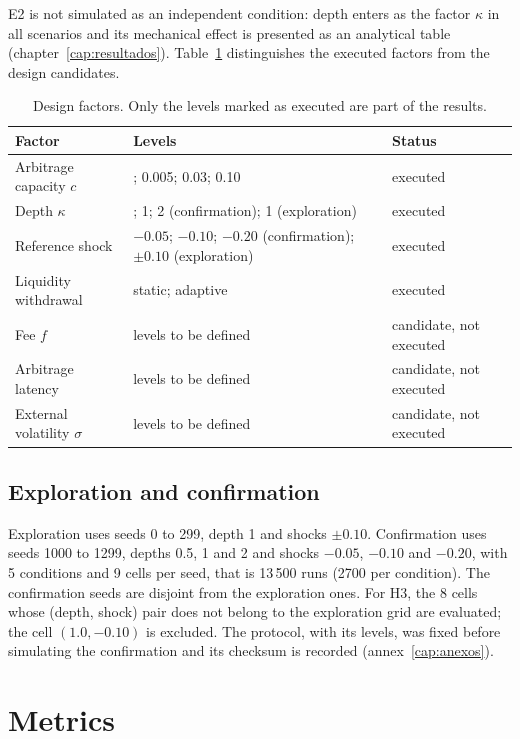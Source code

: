 E2 is not simulated as an independent condition: depth enters as the factor $\kappa$ in all scenarios and its mechanical effect is presented as an analytical table (chapter~\ref{cap:resultados}). Table~\ref{tab:factores} distinguishes the executed factors from the design candidates.

\begin{table}[htbp]
\centering
\caption{Design factors. Only the levels marked as executed are part of the results.}
\label{tab:factores}
\small
\begin{tabularx}{\textwidth}{@{}l >{\raggedright\arraybackslash}X l@{}}
\toprule
Factor & Levels & Status \\
\midrule
Arbitrage capacity $c$ & 0; 0.005; 0.03; 0.10 & executed \\
Depth $\kappa$ & 0.5; 1; 2 (confirmation); 1 (exploration) & executed \\
Reference shock & $-0.05$; $-0.10$; $-0.20$ (confirmation); $\pm0.10$ (exploration) & executed \\
Liquidity withdrawal & static; adaptive & executed \\
Fee $f$ & levels to be defined & candidate, not executed \\
Arbitrage latency & levels to be defined & candidate, not executed \\
External volatility $\sigma$ & levels to be defined & candidate, not executed \\
\bottomrule
\end{tabularx}
\end{table}

\subsection{Exploration and confirmation}

Exploration uses seeds 0 to 299, depth 1 and shocks $\pm0.10$. Confirmation uses seeds 1000 to 1299, depths 0.5, 1 and 2 and shocks $-0.05$, $-0.10$ and $-0.20$, with 5 conditions and 9 cells per seed, that is 13\,500 runs (2700 per condition). The confirmation seeds are disjoint from the exploration ones. For H3, the 8 cells whose (depth, shock) pair does not belong to the exploration grid are evaluated; the cell $(1.0,-0.10)$ is excluded. The protocol, with its levels, was fixed before simulating the confirmation and its checksum is recorded (annex~\ref{cap:anexos}).

\section{Metrics}


